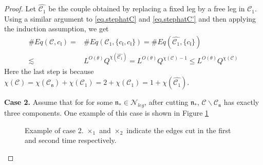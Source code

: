 \begin{proof}
Let $\widehat{\mathcal{C}_1}$ be the couple obtained by replacing a fixed leg by a free leg in $\mathcal{C}_1$. Using a similar argument to \eqref{eq.stephatC} and \eqref{eq.stephatC'} and then applying the induction assumption, we get
\begin{equation}\label{eq.case1.2expand'}
\begin{split}
    \#Eq(\mathcal{C},c_{\mathfrak{l}})=&\#Eq(\mathcal{C}_1, \{c_{\mathfrak{l}}, c_{\mathfrak{l}}\})=\#Eq(\widehat{\mathcal{C}_1}, \{c_{\mathfrak{l}}\})
    \\
    \lesssim& L^{O(\theta)} Q^{\chi(\widehat{\mathcal{C}_1})}=L^{O(\theta)} Q^{\chi(\mathcal{C})-1}\le L^{O(\theta)} Q^{\chi(\mathcal{C})}
\end{split}
\end{equation}
Here the last step is because $\chi(\mathcal{C})=\chi(\mathcal{C}_{\mathfrak{n}})+\chi(\mathcal{C}_1)=2+\chi(\mathcal{C}_1)=1+\chi(\widehat{\mathcal{C}_1})$.

\textbf{Case 2.} Assume that for for some $\mathfrak{n}_*\in \mathcal{N}_{leg}$, after cutting $\mathfrak{n}_*$, $\mathcal{C}\backslash \mathcal{C}_{\mathfrak{n}}$ has exactly three components. One example of this case is shown in Figure \ref{fig.examplecase2}
\begin{figure}[H]
    \centering
    \caption{Example of case 2. $\times_1$ and $\times_2$ indicate the edges cut in the first and second time respectively.}
    \label{fig.examplecase2}
\end{figure}


\end{proof}
